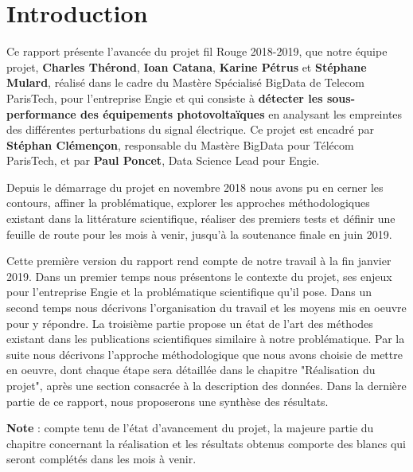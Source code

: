 \chapter*{Introduction}
Ce rapport présente l'avancée du projet fil Rouge 2018-2019, que notre équipe projet, \textbf{Charles Thérond}, \textbf{Ioan Catana}, \textbf{Karine Pétrus} et \textbf{Stéphane Mulard}, réalisé dans le cadre du Mastère Spécialisé BigData de Telecom ParisTech, pour l'entreprise Engie et qui consiste à \textbf{détecter les sous-performance des équipements photovoltaïques} en analysant les empreintes des différentes perturbations du signal électrique. Ce projet est encadré par \textbf{Stéphan Clémençon}, responsable du Mastère BigData pour Télécom ParisTech, et par \textbf{Paul Poncet}, Data Science Lead pour Engie.

Depuis le démarrage du projet en novembre 2018 nous avons pu en cerner les contours, affiner la problématique, explorer les approches méthodologiques existant dans la littérature scientifique, réaliser des premiers tests et définir une feuille de route pour les mois à venir, jusqu'à la soutenance finale en juin 2019.

Cette première version du rapport rend compte de notre travail à la fin janvier 2019. Dans un premier temps nous présentons le contexte du projet, ses enjeux pour l'entreprise Engie et la problématique scientifique qu'il pose. Dans un second temps nous décrivons l'organisation du travail et les moyens mis en oeuvre pour y répondre. La troisième partie propose un état de l'art des méthodes existant dans les publications scientifiques similaire à notre problématique. Par la suite nous décrivons l'approche méthodologique que nous avons choisie de mettre en oeuvre, dont chaque étape sera détaillée dans le chapitre "Réalisation du projet", après une section consacrée à la description des données. Dans la dernière partie de ce rapport, nous proposerons une synthèse des résultats.

\textbf{Note} : compte tenu de l'état d'avancement du projet, la majeure partie du chapitre concernant la réalisation et les résultats obtenus comporte des blancs qui seront complétés dans les mois à venir.